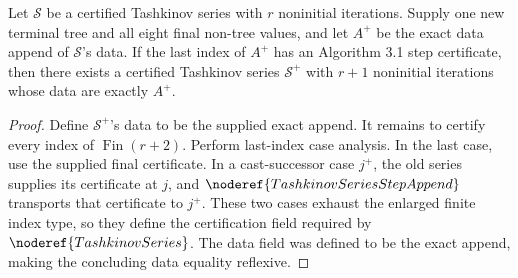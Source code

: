 \begin{theorem}
Let \(\mathcal S\) be a certified Tashkinov series with \(r\) noninitial
iterations.  Supply one new terminal tree and all eight final non-tree values,
and let \(A^+\) be the exact data append of \(\mathcal S\)'s data.  If the
last index of \(A^+\) has an Algorithm 3.1 step certificate, then there exists
a certified Tashkinov series \(\mathcal S^+\) with \(r+1\) noninitial
iterations whose data are exactly \(A^+\).
\end{theorem}
\begin{proof}
Define \(\mathcal S^+\)'s data to be the supplied exact append.  It remains to
certify every index of \(\operatorname{Fin}(r+2)\).  Perform last-index case
analysis.  In the last case, use the supplied final certificate.  In a
cast-successor case \(j^+\), the old series supplies its certificate at
\(j\), and \(\noderef{TashkinovSeriesStepAppend}\) transports that certificate
to \(j^+\).  These two cases exhaust the enlarged finite index type, so they
define the certification field required by \(\noderef{TashkinovSeries}\).
The data field was defined to be the exact append, making the concluding data
equality reflexive.
\end{proof}
